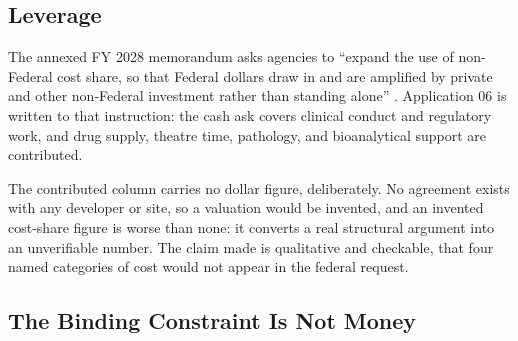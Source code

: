 \subsection{Leverage}

The annexed FY 2028 memorandum asks agencies to ``expand the use of non-Federal
cost share, so that Federal dollars draw in and are amplified by private and
other non-Federal investment rather than standing alone''
\cite{kratsiosvought2026fy2028priorities}. Application 06 is written to that
instruction: the cash ask covers clinical conduct and regulatory work, and drug
supply, theatre time, pathology, and bioanalytical support are contributed.

The contributed column carries no dollar figure, deliberately. No agreement
exists with any developer or site, so a valuation would be invented, and an
invented cost-share figure is worse than none: it converts a real structural
argument into an unverifiable number. The claim made is qualitative and
checkable, that four named categories of cost would not appear in the federal
request.

\subsection{The Binding Constraint Is Not Money}

